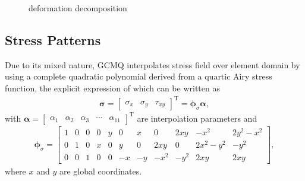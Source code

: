 \documentclass[3p,review,sort&compress,11pt,fleqn]{elsarticle}
\newcommand*{\mT}{\mathrm{T}}
\newcommand*{\mathbold}{\bm}
\begin{document}
\begin{figure}[H]
\caption{deformation decomposition}\label{fig:decompose_deformation}
\end{figure}
\subsection{Stress Patterns}
Due to its mixed nature, GCMQ interpolates stress field over element domain by using a complete quadratic polynomial derived from a quartic Airy stress function, the explicit expression of which can be written as
\begin{gather}
\mathbold{\sigma}=\begin{bmatrix}
	\sigma_x & \sigma_y & \tau_{xy}
\end{bmatrix}^\mT=\mathbold{\phi}_\sigma\mathbold{\alpha},
\end{gather}
with $\mathbold{\alpha}=\begin{bmatrix}
	\alpha_1 & \alpha_2 & \alpha_3 & \cdots & \alpha_{11}
\end{bmatrix}^\mT$ are interpolation parameters and
\begin{gather}\label{eq:stress_patterns}
\mathbold{\phi}_\sigma=
\left[\begin{array}{ccc|cc|cc|cc|cc}
	1 & 0 & 0 & 0 & y & 0  & x  &  0   & 2xy  &   -x^2   & 2y^2-x^2 \\
	0 & 1 & 0 & x & 0 & y  & 0  & 2xy  &  0   & 2x^2-y^2 &   -y^2   \\
	0 & 0 & 1 & 0 & 0 & -x & -y & -x^2 & -y^2 &   2xy    &   2xy
\end{array}\right],
\end{gather}
where $x$ and $y$ are global coordinates.
\end{document}
